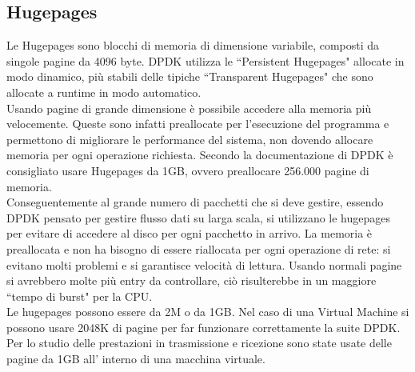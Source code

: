 \subsection*{Hugepages}
Le Hugepages sono blocchi di memoria di dimensione variabile, composti da singole pagine da 4096 byte. DPDK utilizza le ``Persistent Hugepages" allocate in modo dinamico, più stabili delle tipiche ``Transparent Hugepages" che sono allocate a runtime in modo automatico.\\
Usando pagine di grande dimensione è possibile accedere alla memoria più velocemente. Queste sono infatti preallocate per l'esecuzione del programma e permettono di migliorare le performance del sistema, non dovendo allocare memoria per ogni operazione richiesta. 
Secondo la documentazione di DPDK è consigliato usare Hugepages da 1GB, ovvero preallocare 256.000 pagine di memoria.\\
Conseguentemente al grande numero di pacchetti che si deve gestire, essendo DPDK pensato per gestire flusso dati su larga scala, si utilizzano le hugepages per evitare di accedere al disco per ogni pacchetto in arrivo. La memoria è preallocata e non ha bisogno di essere riallocata per ogni operazione di rete: si evitano molti problemi e si garantisce velocità di lettura.
Usando normali pagine si avrebbero molte più entry da controllare, ciò risulterebbe in un maggiore ``tempo di burst" per la CPU.\\
Le hugepages possono essere da 2M o da 1GB. Nel caso di una Virtual Machine si possono usare 2048K di pagine per far funzionare correttamente la suite DPDK. Per lo studio delle prestazioni in trasmissione e ricezione sono state usate delle pagine da 1GB all' interno di una macchina virtuale.

